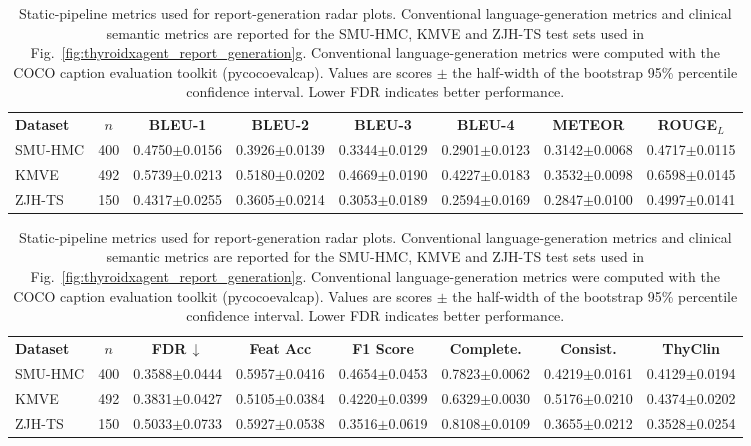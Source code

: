 \begin{table}[p]
\centering
\begin{threeparttable}

\caption{Static-pipeline metrics used for report-generation radar plots. Conventional language-generation metrics and clinical semantic metrics are reported for the SMU-HMC, KMVE and ZJH-TS test sets used in Fig.~\ref{fig:thyroidxagent_report_generation}g. Conventional language-generation metrics were computed with the COCO caption evaluation toolkit (pycocoevalcap). Values are scores $\pm$ the half-width of the bootstrap 95\% percentile confidence interval. Lower FDR indicates better performance.}
\label{tab:static_rule_controller_radar_metrics}

\scriptsize
\setlength{\tabcolsep}{4.2pt}
\renewcommand{\arraystretch}{1.10}

\begin{tabular}{lccccccc}
\toprule
\rowcolor{gray!20}
\multicolumn{8}{c}{\textbf{Conventional natural-language generation metrics}} \\
\midrule
\textbf{Dataset}
& \textbf{\(n\)}
& \textbf{BLEU-1}
& \textbf{BLEU-2}
& \textbf{BLEU-3}
& \textbf{BLEU-4}
& \textbf{METEOR}
& \textbf{ROUGE$_L$} \\
\midrule
SMU-HMC
& 400
& 0.4750$\pm$0.0156
& 0.3926$\pm$0.0139
& 0.3344$\pm$0.0129
& 0.2901$\pm$0.0123
& 0.3142$\pm$0.0068
& 0.4717$\pm$0.0115 \\
KMVE
& 492
& 0.5739$\pm$0.0213
& 0.5180$\pm$0.0202
& 0.4669$\pm$0.0190
& 0.4227$\pm$0.0183
& 0.3532$\pm$0.0098
& 0.6598$\pm$0.0145 \\
ZJH-TS
& 150
& 0.4317$\pm$0.0255
& 0.3605$\pm$0.0214
& 0.3053$\pm$0.0189
& 0.2594$\pm$0.0169
& 0.2847$\pm$0.0100
& 0.4997$\pm$0.0141 \\
\bottomrule
\end{tabular}

\vspace{0.8em}

\begin{tabular}{lccccccc}
\toprule
\rowcolor{gray!20}
\multicolumn{8}{c}{\textbf{Clinical semantic metrics}} \\
\midrule
\textbf{Dataset}
& \textbf{\(n\)}
& \textbf{FDR}\,$\downarrow$
& \textbf{Feat Acc}
& \textbf{F1 Score}
& \textbf{Complete.}
& \textbf{Consist.}
& \textbf{ThyClin} \\
\midrule
SMU-HMC
& 400
& 0.3588$\pm$0.0444
& 0.5957$\pm$0.0416
& 0.4654$\pm$0.0453
& 0.7823$\pm$0.0062
& 0.4219$\pm$0.0161
& 0.4129$\pm$0.0194 \\
KMVE
& 492
& 0.3831$\pm$0.0427
& 0.5105$\pm$0.0384
& 0.4220$\pm$0.0399
& 0.6329$\pm$0.0030
& 0.5176$\pm$0.0210
& 0.4374$\pm$0.0202 \\
ZJH-TS
& 150
& 0.5033$\pm$0.0733
& 0.5927$\pm$0.0538
& 0.3516$\pm$0.0619
& 0.8108$\pm$0.0109
& 0.3655$\pm$0.0212
& 0.3528$\pm$0.0254 \\
\bottomrule
\end{tabular}

\end{threeparttable}
\end{table}
